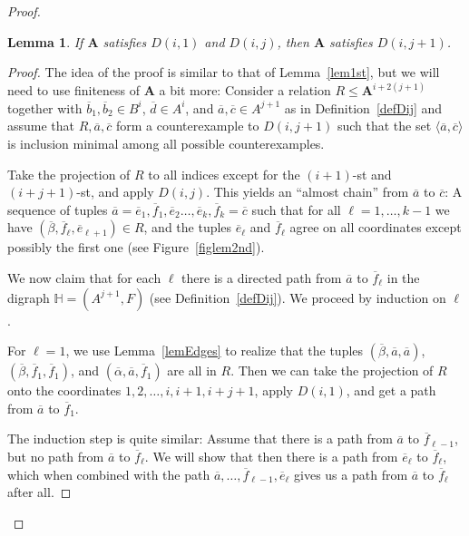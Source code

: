 \documentclass{amsart}
\theoremstyle{plain}
\newtheorem{lemma}[theorem]{Lemma}
\theoremstyle{definition}
\begin{document}
\begin{proof}
\begin{lemma}\label{lem2nd} 
  If ${{\mathbf{A}}}$ satisfies $D(i,1)$ and $D(i,j)$, then ${{\mathbf{A}}}$ satisfies $D(i,j+1)$.  
\end{lemma} 
\begin{proof}  
  The idea of the proof is similar to that of Lemma~\ref{lem1st}, but we will
  need to use finiteness of ${{\mathbf{A}}}$ a bit more: Consider a relation
  $R\leq{{\mathbf{A}}}^{i+2(j+1)}$ together with ${\overline{b}}_1,{\overline{b}}_2 \in B^i$, ${\overline{d}} \in A^i$,
   and ${\overline{a}},{\overline{c}}\in A^{j+1}$ as in Definition~\ref{defDij} and
  assume that $R,{\overline{a}},{\overline{c}}$ form a counterexample to $D(i,j+1)$ such that
  the set $\langle {\overline{a}},{\overline{c}}\rangle$ is inclusion minimal among all
  possible
  counterexamples.
  
  Take the projection of $R$ to all indices except for the $(i+1)$-st and
  $(i+j+1)$-st, and apply $D(i,j)$.  This yields an ``almost chain'' from
  ${\overline{a}}$ to ${\overline{c}}$: A sequence of tuples ${\overline{a}}={\overline{e}}_1,{\overline{f}}_1,{\overline{e}}_2\dots, {\overline{e}}_k,{\overline{f}}_k={\overline{c}}$ such that for all
  $\ell=1,\dots,k-1$ we
  have $({\overline{\beta}},{\overline{f}}_\ell,{\overline{e}}_{\ell+1})\in R$, and the tuples
  ${\overline{e}}_\ell$ and ${\overline{f}}_\ell$ agree on all coordinates except possibly
  the first one (see Figure~\ref{figlem2nd}).

  We now claim that for each $\ell$ there is a directed path from ${\overline{a}}$ to
  ${\overline{f}}_\ell$ in the digraph ${\mathbb{H}}=(A^{j+1}, F)$ (see Definition~\ref{defDij}). We
  proceed by induction on $\ell$. 

  For $\ell=1$, we use Lemma~\ref{lemEdges} to realize that
  the tuples $({\overline{\beta}},{\overline{a}},{\overline{a}})$, $({\overline{\beta}}, {\overline{f}}_1,{\overline{f}}_1)$, and
  $({\overline{\alpha}},{\overline{a}},{\overline{f}}_1)$ are all in $R$. Then we can 
  take the projection of $R$ onto the coordinates
  $1,2,\dots,i,i+1,i+j+1$, apply $D(i,1)$, and get a path from
  ${\overline{a}}$ to ${\overline{f}}_1$.

  The induction step is quite similar: Assume that there is a path from ${\overline{a}}$ to ${\overline{f}}_{\ell-1}$, but no path from ${\overline{a}}$ to ${\overline{f}}_\ell$. We will
  show that then there is a path from ${\overline{e}}_\ell$ to ${\overline{f}}_\ell$, which when
  combined with the path ${\overline{a}},\dots,{\overline{f}}_{\ell-1},{\overline{e}}_\ell$ gives us a
  path from ${\overline{a}}$ to ${\overline{f}}_\ell$ after all.
  

\end{proof}
\end{proof}
\end{document}
